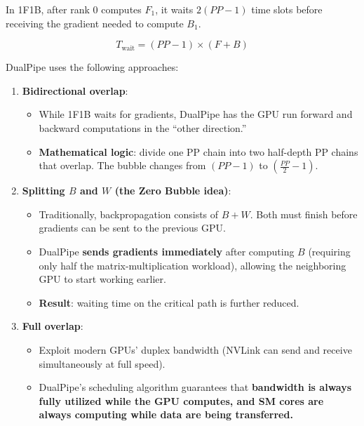 In 1F1B, after rank 0 computes \(F_1\), it waits \(2(PP - 1)\) time slots before receiving the gradient needed to compute \(B_1\).

\[
T_{\mathrm{wait}} = (PP - 1) \times (F + B)
\]

DualPipe uses the following approaches:

\begin{enumerate}
\def\labelenumi{\arabic{enumi}.}
\tightlist
\item
{}
  \textbf{Bidirectional overlap}:

  \begin{itemize}
  \tightlist
  \item
    While 1F1B waits for gradients, DualPipe has the GPU run forward and backward computations in the ``other direction.''
  \item
    \textbf{Mathematical logic}: divide one PP chain into two half-depth PP chains that overlap. The bubble changes from \((PP - 1)\) to \(\left(\frac{PP}{2} - 1\right)\).
  \end{itemize}
\item
{}
  \textbf{Splitting \(B\) and \(W\) (the Zero Bubble idea)}:

  \begin{itemize}
  \tightlist
  \item
    Traditionally, backpropagation consists of \(B + W\). Both must finish before gradients can be sent to the previous GPU.
  \item
    DualPipe \textbf{sends gradients immediately} after computing \(B\) (requiring only half the matrix-multiplication workload), allowing the neighboring GPU to start working earlier.
  \item
    \textbf{Result}: waiting time on the critical path is further reduced.
  \end{itemize}
\item
{}
  \textbf{Full overlap}:

  \begin{itemize}
  \tightlist
  \item
    Exploit modern GPUs' duplex bandwidth (NVLink can send and receive simultaneously at full speed).
  \item
    DualPipe's scheduling algorithm guarantees that \textbf{bandwidth is always fully utilized while the GPU computes, and SM cores are always computing while data are being transferred.}
  \end{itemize}
\end{enumerate}

